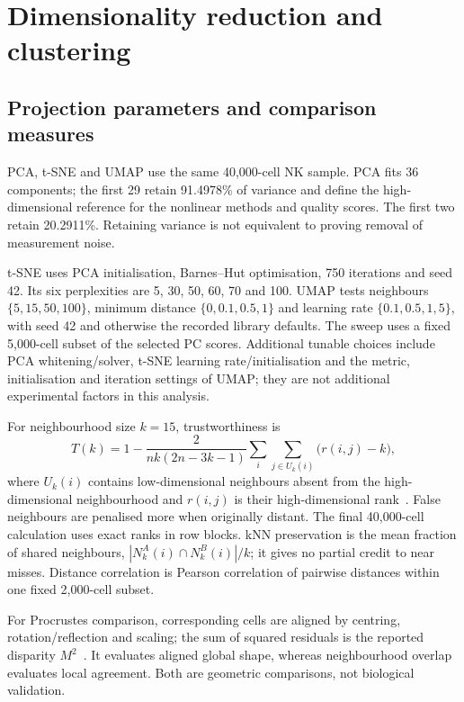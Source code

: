 \documentclass[11pt,a4paper]{article}
\begin{document}
\clearpage
\section{Dimensionality reduction and clustering}
\subsection{Projection parameters and comparison measures}
PCA, t-SNE and UMAP use the same 40,000-cell NK sample. PCA fits 36 components; the first 29 retain 91.4978\% of variance and define the high-dimensional reference for the nonlinear methods and quality scores. The first two retain 20.2911\%. Retaining variance is not equivalent to proving removal of measurement noise.

t-SNE uses PCA initialisation, Barnes--Hut optimisation, 750 iterations and seed 42. Its six perplexities are 5, 30, 50, 60, 70 and 100. UMAP tests neighbours $\{5,15,50,100\}$, minimum distance $\{0,0.1,0.5,1\}$ and learning rate $\{0.1,0.5,1,5\}$, with seed 42 and otherwise the recorded library defaults. The sweep uses a fixed 5,000-cell subset of the selected PC scores. Additional tunable choices include PCA whitening/solver, t-SNE learning rate/initialisation and the metric, initialisation and iteration settings of UMAP; they are not additional experimental factors in this analysis.

For neighbourhood size $k=15$, trustworthiness is
\[
T(k)=1-\frac{2}{nk(2n-3k-1)}\sum_i\sum_{j\in U_k(i)}\bigl(r(i,j)-k\bigr),
\]
where $U_k(i)$ contains low-dimensional neighbours absent from the high-dimensional neighbourhood and $r(i,j)$ is their high-dimensional rank~\cite{trust}. False neighbours are penalised more when originally distant. The final 40,000-cell calculation uses exact ranks in row blocks. kNN preservation is the mean fraction of shared neighbours, $|N_k^A(i)\cap N_k^B(i)|/k$; it gives no partial credit to near misses. Distance correlation is Pearson correlation of pairwise distances within one fixed 2,000-cell subset.

For Procrustes comparison, corresponding cells are aligned by centring, rotation/reflection and scaling; the sum of squared residuals is the reported disparity $M^2$~\cite{scipy}. It evaluates aligned global shape, whereas neighbourhood overlap evaluates local agreement. Both are geometric comparisons, not biological validation.

\begin{table}[htb]\centering\small

\caption{The complete t-SNE sweep. Perplexity 70 wins by trustworthiness; perplexity 30 has slightly higher exact-neighbour overlap. Parameter selection therefore depends on the declared criterion.}
\end{table}
\end{document}

